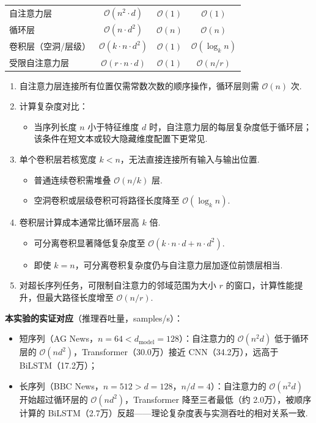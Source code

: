 \documentclass{模版}
\begin{document}
\begin{frame}
\begin{table}[H]
\begin{tabular}{lccc}
        \midrule
        自注意力层 & $\mathcal{O}(n^2 \cdot d)$ & $\mathcal{O}(1)$ & $\mathcal{O}(1)$ \\
        循环层 & $\mathcal{O}(n \cdot d^2)$ & $\mathcal{O}(n)$ & $\mathcal{O}(n)$ \\
        卷积层（空洞/层级） & $\mathcal{O}(k \cdot n \cdot d^2)$ & $\mathcal{O}(1)$ & $\mathcal{O}(\log_k n)$ \\
        受限自注意力层 & $\mathcal{O}(r \cdot n \cdot d)$ & $\mathcal{O}(1)$ & $\mathcal{O}(n / r)$ \\
        \bottomrule
    \end{tabular}
\end{table}
\begin{enumerate}
\fontsize{9pt}{11pt}\selectfont
\item 自注意力层连接所有位置仅需常数次数的顺序操作，循环层则需 $\mathcal{O}(n)$ 次.
\item 计算复杂度对比：
\begin{itemize}
\item 当序列长度 $n$ 小于特征维度 $d$ 时，自注意力层的每层复杂度低于循环层；该条件在短文本或较大隐藏维度配置下更常见.
\end{itemize}
\item 单个卷积层若核宽度 $k < n$，无法直接连接所有输入与输出位置.
\begin{itemize}
\item 普通连续卷积需堆叠 $\mathcal{O}(n/k)$ 层.
\item 空洞卷积或层级卷积可将路径长度降至 $\mathcal{O}(\log_k n)$.
\end{itemize}
\item 卷积层计算成本通常比循环层高 $k$ 倍.
\begin{itemize}
\item 可分离卷积显著降低复杂度至 $\mathcal{O}(k \cdot n \cdot d + n \cdot d^2)$.
\item 即使 $k=n$，可分离卷积复杂度仍与自注意力层加逐位前馈层相当.
\end{itemize}
\item 对超长序列任务，可限制自注意力的邻域范围为大小 $r$ 的窗口，计算性能提升，但最大路径长度增至 $\mathcal{O}(n/r)$.
    \end{enumerate}
\textbf{本实验的实证对应}（推理吞吐量，samples/s）：
\begin{itemize}
    \fontsize{9pt}{11pt}\selectfont
    \item 短序列（AG News，$n=64 < d_{\mathrm{model}}=128$）：自注意力的 $\mathcal{O}(n^2 d)$ 低于循环层的 $\mathcal{O}(n d^2)$，Transformer（30.0万）接近 CNN（34.2万），远高于 BiLSTM（17.2万）；
    \item 长序列（BBC News，$n=512 > d=128$，$n/d=4$）：自注意力的 $\mathcal{O}(n^2 d)$ 开始超过循环层的 $\mathcal{O}(n d^2)$，Transformer 降至三者最低（约 2.0万），被顺序计算的 BiLSTM（2.7万）反超——理论复杂度表与实测吞吐的相对关系一致.
\end{itemize}
\end{frame}
\end{document}
